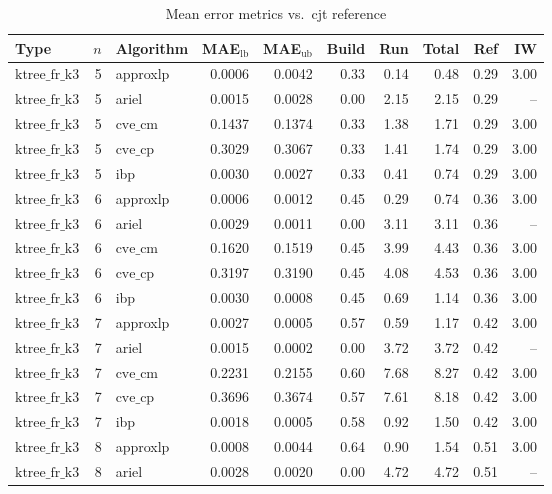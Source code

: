 \begin{table}[ht]
\centering
\scriptsize
\caption{Mean error metrics vs.\ cjt reference}
\begin{tabular}{lrlrrrrrrr}
\toprule
Type & $n$ & Algorithm & MAE$_{\text{lb}}$ & MAE$_{\text{ub}}$ & Build & Run & Total & Ref & IW \\
\midrule
$\text{ktree\_fr\_k3}$ & 5 & approxlp & 0.0006 & 0.0042 & 0.33 & 0.14 & 0.48 & 0.29 & 3.00 \\
$\text{ktree\_fr\_k3}$ & 5 & ariel & 0.0015 & 0.0028 & 0.00 & 2.15 & 2.15 & 0.29 & -- \\
$\text{ktree\_fr\_k3}$ & 5 & $\text{cve\_cm}$ & 0.1437 & 0.1374 & 0.33 & 1.38 & 1.71 & 0.29 & 3.00 \\
$\text{ktree\_fr\_k3}$ & 5 & $\text{cve\_cp}$ & 0.3029 & 0.3067 & 0.33 & 1.41 & 1.74 & 0.29 & 3.00 \\
$\text{ktree\_fr\_k3}$ & 5 & ibp & 0.0030 & 0.0027 & 0.33 & 0.41 & 0.74 & 0.29 & 3.00 \\
$\text{ktree\_fr\_k3}$ & 6 & approxlp & 0.0006 & 0.0012 & 0.45 & 0.29 & 0.74 & 0.36 & 3.00 \\
$\text{ktree\_fr\_k3}$ & 6 & ariel & 0.0029 & 0.0011 & 0.00 & 3.11 & 3.11 & 0.36 & -- \\
$\text{ktree\_fr\_k3}$ & 6 & $\text{cve\_cm}$ & 0.1620 & 0.1519 & 0.45 & 3.99 & 4.43 & 0.36 & 3.00 \\
$\text{ktree\_fr\_k3}$ & 6 & $\text{cve\_cp}$ & 0.3197 & 0.3190 & 0.45 & 4.08 & 4.53 & 0.36 & 3.00 \\
$\text{ktree\_fr\_k3}$ & 6 & ibp & 0.0030 & 0.0008 & 0.45 & 0.69 & 1.14 & 0.36 & 3.00 \\
$\text{ktree\_fr\_k3}$ & 7 & approxlp & 0.0027 & 0.0005 & 0.57 & 0.59 & 1.17 & 0.42 & 3.00 \\
$\text{ktree\_fr\_k3}$ & 7 & ariel & 0.0015 & 0.0002 & 0.00 & 3.72 & 3.72 & 0.42 & -- \\
$\text{ktree\_fr\_k3}$ & 7 & $\text{cve\_cm}$ & 0.2231 & 0.2155 & 0.60 & 7.68 & 8.27 & 0.42 & 3.00 \\
$\text{ktree\_fr\_k3}$ & 7 & $\text{cve\_cp}$ & 0.3696 & 0.3674 & 0.57 & 7.61 & 8.18 & 0.42 & 3.00 \\
$\text{ktree\_fr\_k3}$ & 7 & ibp & 0.0018 & 0.0005 & 0.58 & 0.92 & 1.50 & 0.42 & 3.00 \\
$\text{ktree\_fr\_k3}$ & 8 & approxlp & 0.0008 & 0.0044 & 0.64 & 0.90 & 1.54 & 0.51 & 3.00 \\
$\text{ktree\_fr\_k3}$ & 8 & ariel & 0.0028 & 0.0020 & 0.00 & 4.72 & 4.72 & 0.51 & -- \\

\end{tabular}
\end{table}
